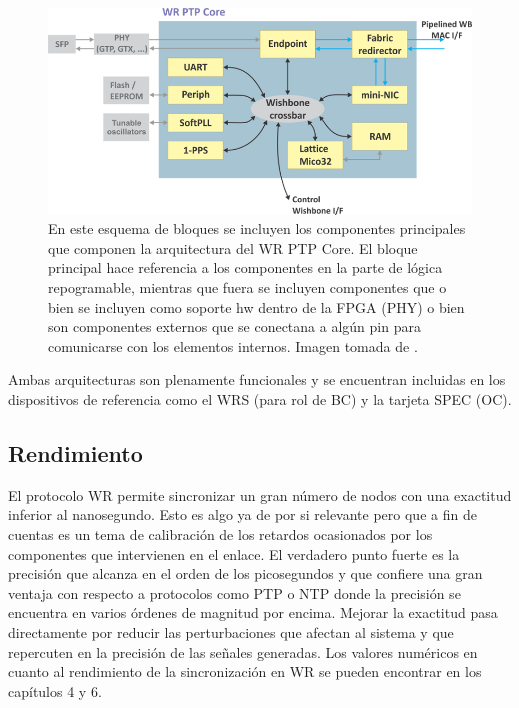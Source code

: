 \begin{figure}
	\centering
	\includegraphics[width=\linewidth]{imagenes/wrpc_inside}
	\caption[Esquema de bloques del WR PTP Core]{En este esquema de bloques se 
		incluyen los componentes principales que componen la arquitectura del 
		WR 
		PTP Core. El bloque principal hace referencia a los componentes en la 
		parte 
		de lógica repogramable, mientras que fuera se incluyen componentes que 
		o 
		bien se incluyen como soporte hw dentro de la FPGA (PHY) o bien son 
		componentes externos que se conectana a algún pin para comunicarse con 
		los 
		elementos internos. Imagen tomada de \cite{Daniluk2012}.}
	\label{fig:wrpcinside}
\end{figure}

Ambas arquitecturas son plenamente funcionales y se encuentran incluidas en los 
dispositivos de referencia como el WRS (para rol de BC) y la tarjeta SPEC 
\cite{website:specwiki} (OC). 

\subsection{Rendimiento}

El protocolo WR permite sincronizar un gran número de nodos con una exactitud 
inferior al nanosegundo. Esto es algo ya de por si relevante pero que a fin de 
cuentas es un tema de calibración de los retardos ocasionados por los 
componentes que intervienen en el enlace. El verdadero punto fuerte es la 
precisión que alcanza en el orden de los picosegundos y que confiere una gran 
ventaja con respecto a protocolos como PTP o NTP donde la precisión se 
encuentra en varios órdenes de magnitud por encima. Mejorar la exactitud pasa 
directamente por reducir las perturbaciones que afectan al sistema y que 
repercuten en la precisión de las señales generadas. Los valores numéricos en 
cuanto al rendimiento de la sincronización en WR se pueden encontrar en los 
capítulos 4 y 6.
